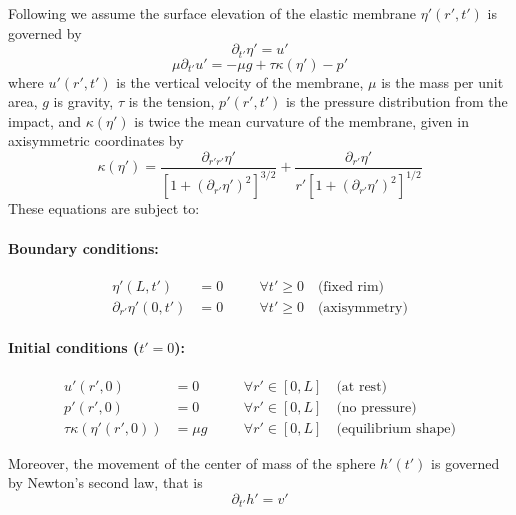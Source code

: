 \documentclass{article}
\begin{document}
Following \citet{AgueroEtAl2022} we assume the surface elevation of the elastic membrane $\eta'(r',t')$ is governed by
\begin{equation}
    \partial_{t'}\eta' = u'
\end{equation}
\begin{equation}
    \mu\partial_{t'}u' = -\mu g + \tau\kappa(\eta') - p'
\end{equation}
where $u'(r', t')$ is the vertical velocity of the membrane, $\mu$ is the mass per unit area, $g$ is gravity, $\tau$ is the tension, $p'(r',t')$ is the pressure distribution from the impact, and $\kappa(\eta')$ is twice the mean curvature of the membrane, given in axisymmetric coordinates by
\begin{equation}
    \kappa(\eta') = \frac{\partial_{r'r'}\eta'}{[1+(\partial_{r'}\eta')^{2}]^{3/2}}+\frac{\partial_{r'}\eta'}{r'[1+(\partial_{r'}\eta')^{2}]^{1/2}}
\end{equation}
These equations are subject to:

\paragraph{Boundary conditions:}
\begin{align}
    \eta'(L, t') &= 0 \quad &&\forall t' \ge 0 \quad \text{(fixed rim)} \label{eq:bc_rim} \\ 
    \partial_{r'}\eta'(0, t') &= 0 \quad &&\forall t' \ge 0 \quad \text{(axisymmetry)} \label{eq:bc_sym}
\end{align}

\paragraph{Initial conditions ($t'=0$):}
\begin{align}
    u'(r', 0) &= 0 \quad &&\forall r' \in [0, L] \quad \text{(at rest)} \label{eq:ic_u} \\
    p'(r', 0) &= 0 \quad &&\forall r' \in [0, L] \quad \text{(no pressure)} \label{eq:ic_p} \\
    \tau\kappa(\eta'(r', 0)) &= \mu g \quad &&\forall r' \in [0, L] \quad \text{(equilibrium shape)} \label{eq:ic_shape}
\end{align}

Moreover, the movement of the center of mass of the sphere $h'(t')$ is governed by Newton's second law, that is
\begin{equation}
    \partial_{t'}h' = v'
\end{equation}
\end{document}
